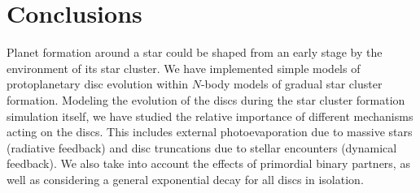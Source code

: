 \documentclass[fleqn,usenatbib]{mnras}
\begin{document}


\section{Conclusions}
Planet formation around a star could be shaped from an early stage by the environment of its star cluster. We have implemented simple models of protoplanetary disc evolution within $N$-body models of gradual star cluster formation. Modeling the evolution of the discs during the star cluster formation simulation itself, we have studied the relative importance of different mechanisms acting on the discs. This includes external photoevaporation due to massive stars (radiative feedback) and disc truncations due to stellar encounters (dynamical feedback). We also take into account the effects of primordial binary partners, as well as considering a general exponential decay for all discs in isolation. 
\end{document}

